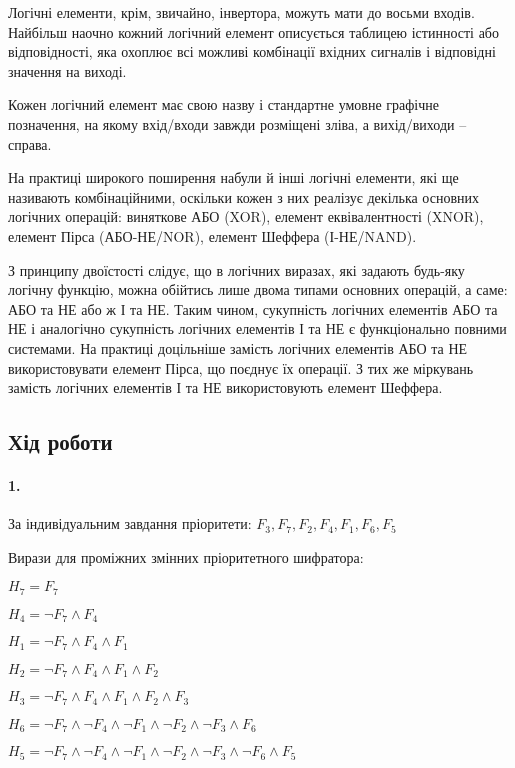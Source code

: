 \documentclass[12pt]{extarticle}
\begin{document}
  Логічні елементи, крім, 
  звичайно, інвертора, можуть мати до восьми входів. 
  Найбільш наочно кожний логічний елемент описується таблицею 
  істинності або відповідності, яка охоплює всі можливі комбінації 
  вхідних сигналів і відповідні значення на виході. 

  Кожен логічний елемент має свою назву і стандартне умовне 
  графічне позначення, на якому вхід/входи завжди розміщені зліва, 
  а вихід/виходи – справа.

На практиці широкого поширення набули й інші логічні елементи, 
які ще називають комбінаційними, оскільки кожен з них реалізує 
декілька основних логічних операцій: виняткове АБО (XOR), елемент 
еквівалентності (XNOR), елемент Пірса (АБО-НЕ/NOR), елемент Шеффера 
(І-НЕ/NAND).

З принципу двоїстості слідує, що в логічних виразах, які задають будь-яку логічну функцію, 
можна обійтись лише двома типами основних операцій, а саме: АБО та НЕ або ж
 І та НЕ. Таким чином, сукупність логічних елементів АБО та НЕ і аналогічно
  сукупність логічних елементів І та НЕ є функціонально повними системами. 
  На практиці доцільніше замість логічних елементів АБО та НЕ 
  використовувати елемент Пірса, що поєднує їх операції. З тих же
 міркувань замість логічних елементів І та НЕ використовують елемент Шеффера. 

\subsection*{Хід роботи}
\paragraph{1.}

За індивідуальним завдання пріоритети: $F_3, F_7, F_2, F_4, F_1, F_6, F_5$ 

Вирази для проміжних змінних пріоритетного шифратора:

$H_7=F_7$

$H_4=\neg F_7\land F_4 $

$H_1=\neg F_7\land F_4\land F_1 $

$H_2=\neg F_7\land F_4\land F_1\land F_2 $

$H_3=\neg F_7\land F_4\land F_1\land F_2\land F_3 $

$H_6=\neg F_7\land \neg F_4\land \neg F_1\land \neg 
            F_2\land \neg F_3\land F_6 $

$H_5=\neg F_7\land \neg F_4\land \neg F_1\land \neg 
            F_2\land \neg F_3\land \neg F_6\land F_5 $
\end{document}
